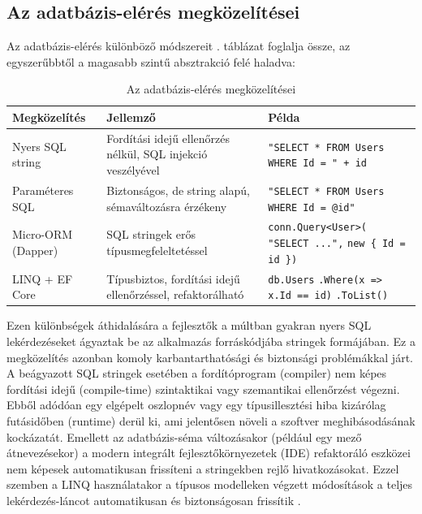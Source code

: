 \documentclass[a4paper,12pt]{article}
\begin{document}
\subsection{Az adatbázis-elérés megközelítései}

Az adatbázis-elérés különböző módszereit . táblázat foglalja össze, az egyszerűbbtől a magasabb szintű absztrakció felé haladva:
 
\begin{table}[h]
\centering
\caption{Az adatbázis-elérés megközelítései}
\label{tab:adatbazis-eleres}
\renewcommand{\arraystretch}{1.4}
\small
\begin{tabular}{|p{}|p{}|p{}|}
\hline
\textbf{Megközelítés} & \textbf{Jellemző} & \textbf{Példa} \\
\hline
Nyers SQL string & Fordítási idejű ellenőrzés nélkül, SQL injekció veszélyével &
  \texttt{"SELECT * FROM Users} \newline \texttt{WHERE Id = " + id} \\
\hline
Paraméteres SQL & Biztonságos, de string alapú, sémaváltozásra érzékeny &
  \texttt{"SELECT * FROM Users} \newline \texttt{WHERE Id = @id"} \\
\hline
Micro-ORM (Dapper) & SQL stringek erős típusmegfeleltetéssel &
  \texttt{conn.Query<User>(} \newline \texttt{"SELECT ...",} \newline \texttt{new \{ Id = id \})} \\
\hline
LINQ + EF Core & Típusbiztos, fordítási idejű ellenőrzéssel, refaktorálható &
  \texttt{db.Users} \newline \texttt{.Where(x => x.Id == id)} \newline \texttt{.ToList()} \\
\hline
\end{tabular}
\end{table}

Ezen különbségek áthidalására a fejlesztők a múltban gyakran nyers SQL lekérdezéseket ágyaztak be az alkalmazás forráskódjába stringek formájában. Ez a megközelítés azonban komoly karbantarthatósági és biztonsági problémákkal járt. A beágyazott SQL stringek esetében a fordítóprogram (compiler) nem képes fordítási idejű (compile-time) szintaktikai vagy szemantikai ellenőrzést végezni. Ebből adódóan egy elgépelt oszlopnév vagy egy típusillesztési hiba kizárólag futásidőben (runtime) derül ki, ami jelentősen növeli a szoftver meghibásodásának kockázatát. Emellett az adatbázis-séma változásakor (például egy mező átnevezésekor) a modern integrált fejlesztőkörnyezetek (IDE) refaktoráló eszközei nem képesek automatikusan frissíteni a stringekben rejlő hivatkozásokat. Ezzel szemben a LINQ használatakor a típusos modelleken végzett módosítások a teljes lekérdezés-láncot automatikusan és biztonságosan frissítik \cite{skeet2019csharp}.
\end{document}
